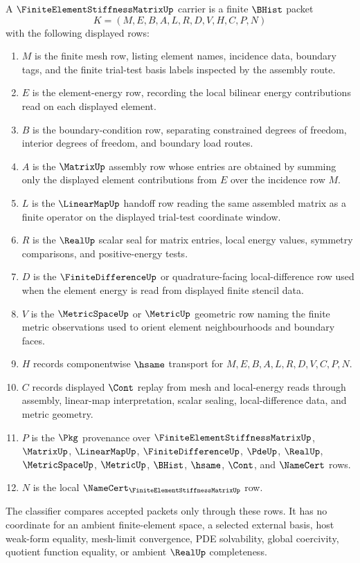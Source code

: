 \begin{definition}
\label{def:finite-element-stiffness-matrix-carrier}
A $\FiniteElementStiffnessMatrixUp$ carrier is a finite $\BHist$ packet
$$
K=(M,E,B,A,L,R,D,V,H,C,P,N)
$$
with the following displayed rows:
\begin{enumerate}
\item $M$ is the finite mesh row, listing element names, incidence data, boundary tags, and the finite trial-test basis labels inspected by the assembly route.
\item $E$ is the element-energy row, recording the local bilinear energy contributions read on each displayed element.
\item $B$ is the boundary-condition row, separating constrained degrees of freedom, interior degrees of freedom, and boundary load routes.
\item $A$ is the $\MatrixUp$ assembly row whose entries are obtained by summing only the displayed element contributions from $E$ over the incidence row $M$.
\item $L$ is the $\LinearMapUp$ handoff row reading the same assembled matrix as a finite operator on the displayed trial-test coordinate window.
\item $R$ is the $\RealUp$ scalar seal for matrix entries, local energy values, symmetry comparisons, and positive-energy tests.
\item $D$ is the $\FiniteDifferenceUp$ or quadrature-facing local-difference row used when the element energy is read from displayed finite stencil data.
\item $V$ is the $\MetricSpaceUp$ or $\MetricUp$ geometric row naming the finite metric observations used to orient element neighbourhoods and boundary faces.
\item $H$ records componentwise $\hsame$ transport for $M,E,B,A,L,R,D,V,C,P,N$.
\item $C$ records displayed $\Cont$ replay from mesh and local-energy reads through assembly, linear-map interpretation, scalar sealing, local-difference data, and metric geometry.
\item $P$ is the $\Pkg$ provenance over $\FiniteElementStiffnessMatrixUp$, $\MatrixUp$, $\LinearMapUp$, $\FiniteDifferenceUp$, $\PdeUp$, $\RealUp$, $\MetricSpaceUp$, $\MetricUp$, $\BHist$, $\hsame$, $\Cont$, and $\NameCert$ rows.
\item $N$ is the local $\NameCert_{\FiniteElementStiffnessMatrixUp}$ row.
\end{enumerate}
The classifier compares accepted packets only through these rows. It has no coordinate for an ambient finite-element space, a selected external basis, host weak-form equality, mesh-limit convergence, PDE solvability, global coercivity, quotient function equality, or ambient $\RealUp$ completeness.
\end{definition}

